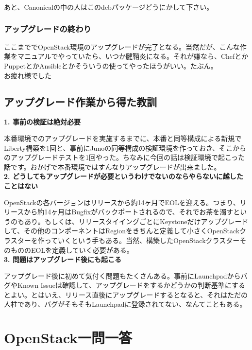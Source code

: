 \documentclass[9pt,b5paper,tombo,openany]{jsbook}
\begin{document}
\noindent
あと、Canonicalの中の人はこのdebパッケージどうにかして下さい。\\[1ex]

\subsection{アップグレードの終わり}
ここまででOpenStack環境のアップグレードが完了となる。当然だが、こんな作業をマニュアルでやっていたら、いつか腱鞘炎になる。それが嫌なら、ChefとかPuppetとかAnsibleとかそういうの使ってやったほうがいい。たぶん。\\[1ex]

\noindent
お疲れ様でした

\section{アップグレード作業から得た教訓}
\noindent
\textbf{1. 事前の検証は絶対必要}

本番環境でのアップグレードを実施するまでに、本番と同等構成による新規でLiberty構築を1回と、事前にJunoの同等構成の検証環境を作っておき、そこからのアップグレードテストを1回やった。ちなみに今回の話は検証環境で起こった話です。おかげで本番環境ではすんなりアップグレードが出来ました。\\

\noindent
\textbf{2. どうしてもアップグレードが必要というわけでないのならやらないに越したことはない}

OpenStackの各バージョンはリリースから約14ヶ月でEOLを迎える。つまり、リリースから約14ヶ月はBugfixがバックポートされるので、それでお茶を濁すというのもあり。もしくは、リリースタイイングごとにKeystoneだけアップグレードして、その他のコンポーネントはRegionをきちんと定義して小さくOpenStackクラスターを作っていくという手もある。当然、構築したOpenStackクラスターそのもののEOLを定義していく必要がある。\\

\noindent
\textbf{3. 問題はアップグレード後にも起こる}

アップグレード後に初めて気付く問題もたくさんある。事前にLaunchpadからバグやKnown Issueは確認して、アップグレードをするかどうかの判断基準にするとよい。とはいえ、リリース直後にアップグレードするとなると、それはただの人柱であり、バグがそもそもLaunchpadに登録されてない、なんてこともある。

\chapter{OpenStack一問一答}
\end{document}
